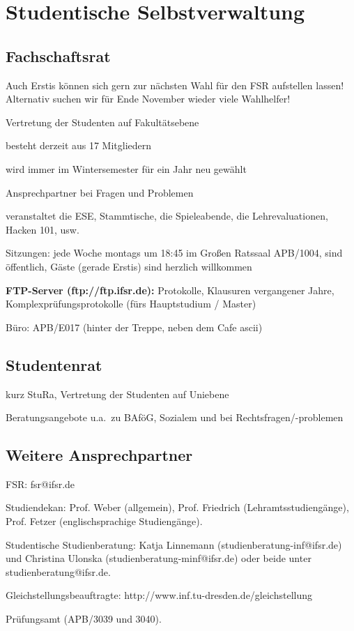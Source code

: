\documentclass[a4paper,12pt]{report}
\begin{document}
\section{Studentische Selbstverwaltung}

\subsection{Fachschaftsrat}
\begin{itemize*}
    \item Auch Erstis können sich gern zur nächsten Wahl für den FSR aufstellen lassen! Alternativ suchen wir für Ende November wieder viele Wahlhelfer!
    \item Vertretung der Studenten auf Fakultätsebene
    \item besteht derzeit aus 17 Mitgliedern
    \item wird immer im Wintersemester für ein Jahr neu gewählt
    \item Ansprechpartner bei Fragen und Problemen
    \item veranstaltet die ESE, Stammtische, die Spieleabende, die Lehrevaluationen, Hacken 101, usw.
    \item Sitzungen: jede Woche montags um 18:45 im Großen Ratssaal APB/1004, sind öffentlich, Gäste (gerade Erstis) sind herzlich willkommen
    \item \textbf{FTP-Server (ftp://ftp.ifsr.de):} Protokolle, Klausuren vergangener Jahre, Komplexprüfungsprotokolle (fürs Hauptstudium / Master)
    \item Büro: APB/E017 (hinter der Treppe, neben dem Cafe ascii)
\end{itemize*}

\subsection{Studentenrat}
\begin{itemize*}
    \item kurz StuRa, Vertretung der Studenten auf Uniebene
    \item Beratungsangebote u.a.\ zu BAföG, Sozialem und bei Rechtsfragen/-problemen
\end{itemize*}

\subsection{Weitere Ansprechpartner}
\begin{itemize*}
    \item FSR: fsr@ifsr.de
    \item Studiendekan: Prof. Weber (allgemein), Prof. Friedrich (Lehramtsstudiengänge), Prof. Fetzer (englischsprachige Studiengänge).
    \item Studentische Studienberatung: Katja Linnemann (studienberatung-inf@ifsr.de) und Christina Ulonska (studienberatung-minf@ifsr.de) oder beide unter studienberatung@ifsr.de.
    \item Gleichstellungsbeauftragte: http://www.inf.tu-dresden.de/gleichstellung
    \item Prüfungsamt (APB/3039 und 3040).
\end{itemize*}
\end{document}
